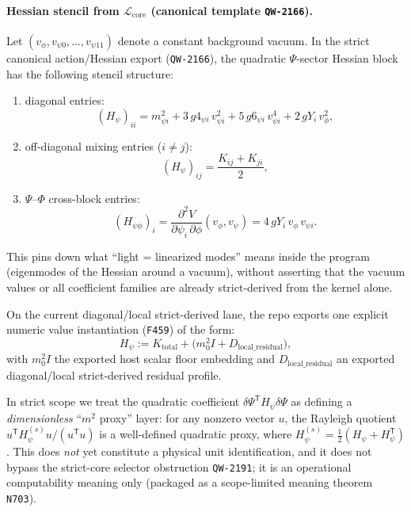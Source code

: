 \documentclass[11pt,a4paper]{article}
\begin{document}
\paragraph{Hessian stencil from $\mathcal{L}_{\mathrm{core}}$ (canonical template \texttt{QW-2166}).}
Let $(v_{\phi},v_{\psi 0},\dots,v_{\psi 11})$ denote a constant background vacuum.
In the strict canonical action/Hessian export (\texttt{QW-2166}), the quadratic $\Psi$-sector Hessian block has the following stencil structure:
\begin{enumerate}[label=\arabic*.]
  \item diagonal entries:
  \[
  (H_{\psi})_{ii}
  =
  m_{\psi i}^2
  +3\,g4_{\psi i}\,v_{\psi i}^2
  +5\,g6_{\psi i}\,v_{\psi i}^4
  +2\,gY_i\,v_{\phi}^2,
  \]
  \item off-diagonal mixing entries ($i\neq j$):
  \[
  (H_{\psi})_{ij}
  =
  \frac{K_{ij}+K_{ji}}{2},
  \]
  \item $\Psi$--$\Phi$ cross-block entries:
  \[
  (H_{\psi\phi})_{i}
  =
  \frac{\partial^2 V}{\partial \psi_i\,\partial \phi}(v_{\phi},v_{\psi})
  =
  4\,gY_i\,v_{\phi}\,v_{\psi i}.
  \]
\end{enumerate}
This pins down what “light = linearized modes” means inside the program (eigenmodes of the Hessian around a vacuum),
without asserting that the vacuum values or all coefficient families are already strict-derived from the kernel alone.

On the current diagonal/local strict-derived lane, the repo exports one explicit numeric value instantiation (\texttt{F459}) of the form:
\[
H_{\psi}
:=
K_{\mathrm{total}} + \bigl(m_0^2 I + D_{\mathrm{local\_residual}}\bigr),
\]
with $m_0^2 I$ the exported host scalar floor embedding and $D_{\mathrm{local\_residual}}$ an exported diagonal/local strict-derived residual profile.

In strict scope we treat the quadratic coefficient $\delta\Psi^{\mathsf T}H_{\psi}\delta\Psi$ as defining a \emph{dimensionless} “$m^2$ proxy” layer:
for any nonzero vector $u$, the Rayleigh quotient
$u^{\mathsf T}H_{\psi}^{(s)}u/(u^{\mathsf T}u)$ is a well-defined quadratic proxy, where $H_{\psi}^{(s)}=\tfrac12(H_{\psi}+H_{\psi}^{\mathsf T})$.
This does \emph{not} yet constitute a physical unit identification, and it does not bypass the strict-core selector obstruction \texttt{QW-2191};
it is an operational computability meaning only (packaged as a scope-limited meaning theorem \texttt{N703}).
\end{document}
